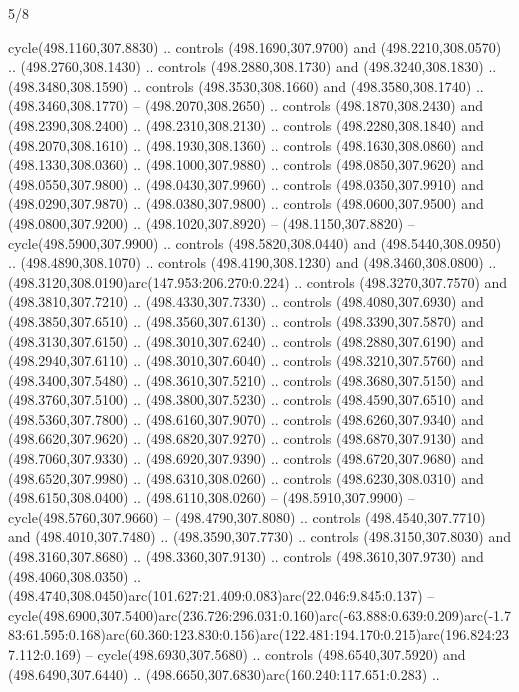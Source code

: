 \begin{flagdescription}{5/8}
\begin{scope}[xshift=0.5\flaglength,yshift=0.5\flagwidth,scale=\flagwidth/475.63]
\begin{scope}[y=0.8pt, x=0.8pt, yscale=-1, xscale=1,shift={(-450,-300)}]
\begin{scope}[cm={{1.0,0.0,0.0,1.0,(-0.0002,0.12556)}},cm={{1.0,0.0,0.0,1.0,(0.00179,0.0)}}]
\begin{scope}[cm={{1.11592,0.0,0.0,1.11592,(-106.89933,-41.77764)}}]
\begin{scope}[draw=black,fill=cfff]
\begin{scope}[fill=black]
  cycle(498.1160,307.8830) .. controls (498.1690,307.9700) and
  (498.2210,308.0570) .. (498.2760,308.1430) .. controls (498.2880,308.1730) and
  (498.3240,308.1830) .. (498.3480,308.1590) .. controls (498.3530,308.1660) and
  (498.3580,308.1740) .. (498.3460,308.1770) -- (498.2070,308.2650) .. controls
  (498.1870,308.2430) and (498.2390,308.2400) .. (498.2310,308.2130) .. controls
  (498.2280,308.1840) and (498.2070,308.1610) .. (498.1930,308.1360) .. controls
  (498.1630,308.0860) and (498.1330,308.0360) .. (498.1000,307.9880) .. controls
  (498.0850,307.9620) and (498.0550,307.9800) .. (498.0430,307.9960) .. controls
  (498.0350,307.9910) and (498.0290,307.9870) .. (498.0380,307.9800) .. controls
  (498.0600,307.9500) and (498.0800,307.9200) .. (498.1020,307.8920) --
  (498.1150,307.8820) -- cycle(498.5900,307.9900) .. controls
  (498.5820,308.0440) and (498.5440,308.0950) .. (498.4890,308.1070) .. controls
  (498.4190,308.1230) and (498.3460,308.0800) ..
  (498.3120,308.0190)arc(147.953:206.270:0.224) .. controls (498.3270,307.7570)
  and (498.3810,307.7210) .. (498.4330,307.7330) .. controls (498.4080,307.6930)
  and (498.3850,307.6510) .. (498.3560,307.6130) .. controls (498.3390,307.5870)
  and (498.3130,307.6150) .. (498.3010,307.6240) .. controls (498.2880,307.6190)
  and (498.2940,307.6110) .. (498.3010,307.6040) .. controls (498.3210,307.5760)
  and (498.3400,307.5480) .. (498.3610,307.5210) .. controls (498.3680,307.5150)
  and (498.3760,307.5100) .. (498.3800,307.5230) .. controls (498.4590,307.6510)
  and (498.5360,307.7800) .. (498.6160,307.9070) .. controls (498.6260,307.9340)
  and (498.6620,307.9620) .. (498.6820,307.9270) .. controls (498.6870,307.9130)
  and (498.7060,307.9330) .. (498.6920,307.9390) .. controls (498.6720,307.9680)
  and (498.6520,307.9980) .. (498.6310,308.0260) .. controls (498.6230,308.0310)
  and (498.6150,308.0400) .. (498.6110,308.0260) -- (498.5910,307.9900) --
  cycle(498.5760,307.9660) -- (498.4790,307.8080) .. controls
  (498.4540,307.7710) and (498.4010,307.7480) .. (498.3590,307.7730) .. controls
  (498.3150,307.8030) and (498.3160,307.8680) .. (498.3360,307.9130) .. controls
  (498.3610,307.9730) and (498.4060,308.0350) ..
  (498.4740,308.0450)arc(101.627:21.409:0.083)arc(22.046:9.845:0.137) --
  cycle(498.6900,307.5400)arc(236.726:296.031:0.160)arc(-63.888:0.639:0.209)arc(-1.783:61.595:0.168)arc(60.360:123.830:0.156)arc(122.481:194.170:0.215)arc(196.824:237.112:0.169)
  -- cycle(498.6930,307.5680) .. controls (498.6540,307.5920) and
  (498.6490,307.6440) .. (498.6650,307.6830)arc(160.240:117.651:0.283) ..

\end{scope}
\end{scope}
\end{scope}
\end{scope}
\end{scope}
\end{scope}
\end{flagdescription}
